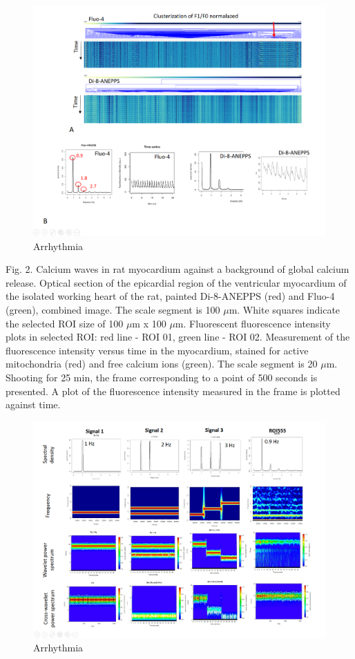 \documentclass[a4paper,12pt]{article}
\begin{document}
\begin{figure}
    \includegraphics[width=\linewidth]{fig6.png}
    \caption{Arrhythmia}
    \label{fig:fig6}
\end{figure}

Fig. 2.  Calcium waves in rat myocardium against a background of global calcium release. Optical section of the epicardial region of the ventricular myocardium of the isolated working heart of the rat, painted Di-8-ANEPPS (red) and Fluo-4 (green), combined image. The scale segment is 100 $\mu$m. White squares indicate the selected ROI size of 100 $\mu$m x 100 $\mu$m. Fluorescent fluorescence intensity plots in selected ROI: red line - ROI 01, green line - ROI 02. Measurement of the fluorescence intensity versus time in the myocardium, stained for active mitochondria (red) and free calcium ions (green). The scale segment is 20 $\mu$m. Shooting for 25 min, the frame corresponding to a point of 500 seconds is presented. A plot of the fluorescence intensity measured in the frame is plotted against time.

\begin{figure}
    \includegraphics[width=\linewidth]{fig7.png}
    \caption{Arrhythmia}
    \label{fig:fig7}
\end{figure}
\end{document}
